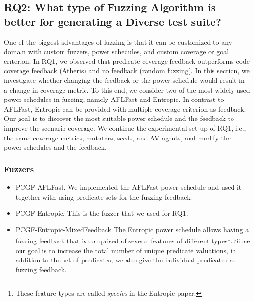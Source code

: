 \subsection{RQ2: What type of Fuzzing Algorithm is better for generating a Diverse test suite?}


One of the biggest advantages of fuzzing is that it can be customized to any domain with custom fuzzers, power schedules, and custom coverage or goal criterion.
% 
In RQ1, we observed that predicate coverage feedback outperforms code coverage feedback (Atheris) and no feedback (random fuzzing).
% 
In this section, we investigate whether changing the feedback or the power schedule would result in a change in coverage metric.
% 
To this end, we consider two of the most widely used power schedules in fuzzing, namely AFLFast and Entropic. 
% 
In contrast to AFLFast, Entropic can be provided with multiple coverage criterion as feedback.
% 
Our goal is to discover the most suitable power schedule and the feedback to improve the scenario coverage. 
%
We continue the experimental set up of RQ1, i.e., the same coverage metrics, mutators, seeds, and AV agents, and modify the power schedules and the feedback.


\subsubsection{Fuzzers}
\begin{itemize}
    \item PCGF-AFLFast.
    We implemented the AFLFast power schedule \cite{fuzzingbook2023:GreyboxFuzzer} and used it together with using predicate-sets for the fuzzing feedback.

    \item PCGF-Entropic.
    This is the fuzzer that we used for RQ1.

    \item PCGF-Entropic-MixedFeedback
    The Entropic power schedule allows having a fuzzing feedback that is comprised of several features of different types\footnote{These feature types are called \emph{species} in the Entropic paper.}.
    Since our goal is to increase the total number of unique predicate valuations, in addition to the set of predicates, we also give the individual predicates as fuzzing feedback.

\end{itemize}



